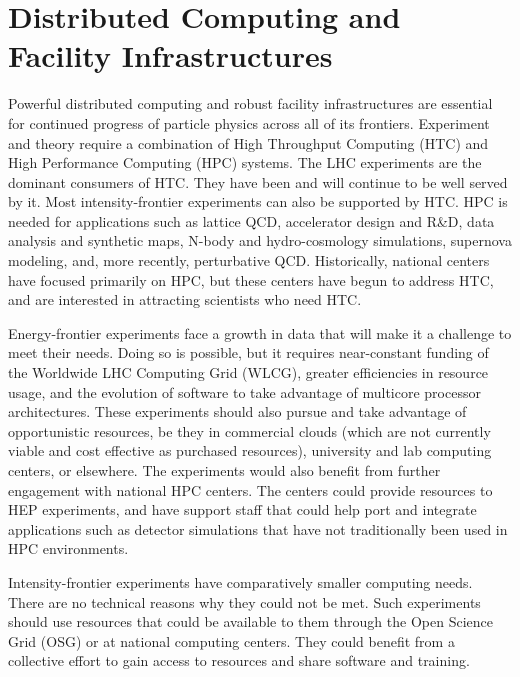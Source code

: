\section{Distributed Computing and Facility Infrastructures}

Powerful distributed computing and robust facility infrastructures are essential for continued progress of particle physics across all of its frontiers.  Experiment and theory require a combination of High Throughput Computing (HTC) and High Performance Computing (HPC) systems.  The LHC experiments are the dominant consumers of HTC.  They have been and will continue to be well served by it.  Most intensity-frontier experiments can also be supported by HTC.  HPC is needed for applications such as lattice QCD, accelerator design and R\&D, data analysis and synthetic maps, N-body and hydro-cosmology simulations, supernova modeling, and, more recently, perturbative QCD.  Historically, national centers have focused primarily on HPC, but these centers have begun to address HTC, and are interested in attracting scientists who need HTC.

Energy-frontier experiments face a growth in data that will make it a challenge to meet their needs.  Doing so is possible, but it requires near-constant funding of the Worldwide LHC Computing Grid (WLCG), greater efficiencies in resource usage, and the evolution of software to take advantage of multicore processor architectures.   These experiments should also pursue and take advantage of opportunistic resources, be they in commercial clouds (which are not currently viable and cost effective as purchased resources), university and lab computing centers, or elsewhere.  The experiments would also benefit from further engagement with national HPC centers.  The centers could provide resources to HEP experiments, and have support staff that could help port and integrate applications such as detector simulations that have not traditionally been used in HPC environments.

Intensity-frontier experiments have comparatively smaller computing needs.  There are no technical reasons why they could not be met.  Such experiments should  use resources that could be available to them through the Open Science Grid (OSG) or at national computing centers.  They could benefit from a collective effort to gain access to resources and share software and training.

